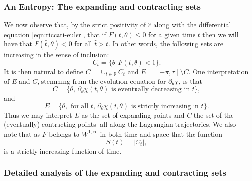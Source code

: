 \documentclass[10pt]{article}
\numberwithin{equation}{section}
\theoremstyle{plain}
\theoremstyle{definition}
\newcommand{\Rr}{{\mathbb R}}
\numberwithin{equation}{section}
\begin{document}
\subsubsection{An Entropy: The expanding and contracting sets}
We now observe that, by the strict positivity of $\hat c$ along with the differential equation \eqref{eqn:riccati-euler}, that if $F(t,\theta)\leq 0$ for a given time $t$ then we will have that $F(\hat t, \theta) < 0$ for all $\hat t > t$. In other words, the following sets are increasing in the sense of inclusion:
\[
C_t=\{\theta, F(t,\theta)< 0\}.
\]
It is then natural to define $C=\cup_{t\in \Rr }C_t$ and $E=[-\pi,\pi]\setminus C$. One interpretation of $E$ and $C$, stemming from the evolution equation for $\partial_\theta \chi$, is that
\[C=\{\theta,\ \partial_\theta\chi(t,\theta) \text{ is eventually decreasing in }t\},
\]
and 
\[
E=\{\theta, \text{ for all }t,\ \partial_\theta\chi(t,\theta) \text{ is strictly increasing in } t\}.
\]
Thus we may interpret $E$ as the set of expanding points and $C$ the set of the (eventually) contracting points, all along the Lagrangian trajectories. We also note that as $F$ belongs to $W^{1,\infty}$ in both time and space that the function
\[
S(t)=|C_t|,
\]
is a strictly increasing function of  time.
\subsubsection{Detailed analysis of the expanding and contracting sets}
\end{document}
